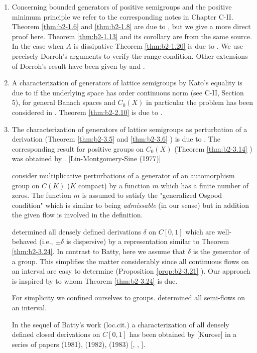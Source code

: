 \begin{enumerate}[label=\emph{Section \arabic*:}, wide, itemsep=1ex]

\item
Concerning bounded generators of positive semigroups and the positive minimum principle we refer to the corresponding notes in Chapter C-II.
Theorem \ref{thm:b2-1.6} and \ref{thm:b2-1.8} are due to \citet{arendtchernoffkato:1982}, but we give a more direct proof here.
Theorem \ref{thm:b2-1.13} and its corollary are from the same source.
In the case when $A$ is dissipative Theorem \ref{thm:b2-1.20} is due to \citet{dorroh:1966}.
We use precisely Dorroh's arguments to verify the range condition.
Other extensions of Dorroh's result have been given by \citet{lumer:1974} and \citet{lumer:1975}.

\item 
A characterization of generators of lattice semigroups by Kato's equality is due to  \citet{nageluhlig:1981} if the underlying space has order continuous norm (see C-II, Section 5), for general Banach spaces and $C_{0}(X)$ in particular the problem has been considered in \citet{arendt:1982}.
Theorem \ref{thm:b2-2.10} is due to \citet{uhlig:1979}.

\item
The characterization of generators of lattice semigroups as perturbation of a derivation (Theorem \ref{thm:b2-3.5} and \ref{thm:b2-3.6} ) is due to \citet{derndingernagel:1979}.
The corresponding result for positive groups on $C_{0}(X)$ (Theorem \ref{thm:b2-3.14} ) was obtained by \citet{arendtgreiner:1984}.
\citet{linetal:1977} [Lin-Montgomery-Sine (1977)] 

consider multiplicative perturbations of a generator of an automorphism group on $C(K)$ ($K$ compact) by a function $m$ which has a finite number of zeros.
The function $m$ is assumed to satisfy the "generalized Osgood condition" which is similar to being \emph{admissable} (in our sense) but in addition the given flow is involved in the definition.

\citet{batty:1981} determined all densely defined derivations $\delta$ on $C[0,1]$ which are well-behaved (i.e., $\pm\delta$ is dispersive) by a representation similar to Theorem \ref{thm:b2-3.24}.
In contrast to Batty, here we assume that $\delta$ is the generator of a group.
This simplifies the matter considerably since all continuous flows on an interval are easy to determine (Proposition \ref{prop:b2-3.21} ).
Our approach is inspired by \citet{delaubenfels:1984} to whom Theorem \ref{thm:b2-3.24} is due.

For simplicity we confined ourselves to groups.
\citet{uhlig:1979} determined all semi-flows on an interval.

In the sequel of Batty's work (loc.cit.) a characterization of all densely defined closed derivations on $C[0,1]$ has been obtained by
 [Kurose] in a series of papers (1981), (1982), (1983) [\citet{kurose:1981}, \citet{kurose:1982}, \citet{kurose:1983}].
\end{enumerate}

